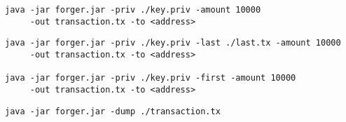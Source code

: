 \documentclass[../documentation.tex]{subfiles}
\begin{document}
\begin{lstlisting}[style=generic]
java -jar forger.jar -priv ./key.priv -amount 10000
     -out transaction.tx -to <address>
\end{lstlisting}

\begin{lstlisting}[style=generic]
java -jar forger.jar -priv ./key.priv -last ./last.tx -amount 10000
     -out transaction.tx -to <address>

java -jar forger.jar -priv ./key.priv -first -amount 10000
     -out transaction.tx -to <address>
\end{lstlisting}

\begin{lstlisting}[style=generic]
java -jar forger.jar -dump ./transaction.tx
\end{lstlisting}
\end{document}
